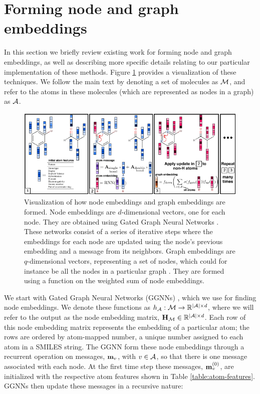 \section{Forming node and graph embeddings}

In this section we briefly review existing work for forming node and graph embeddings, as well as describing more specific details relating to our particular implementation of these methods. Figure \ref{fig:graph_nn} provides a visualization of these techniques. 
We follow the main text by denoting a set of molecules as ${\mathcal{M}}$, and refer to the atoms in these molecules (which are represented as nodes in a graph) as ${\mathcal{A}}$.


\begin{figure}
\centering
\includegraphics[width=\textwidth]{imgs/graph_nn}
\caption{
Visualization of how node embeddings and graph embeddings are formed. 
Node embeddings are $d$-dimensional vectors, one for each node. 
They are obtained using Gated Graph Neural Networks \citep{li2016gated}.
These networks consist of a series of iterative steps where the embeddings for each node are updated using the node's previous embedding and a message from its neighbors.
 Graph embeddings are $q$-dimensional vectors, representing a set of nodes, which could for instance be all the nodes in a particular graph \citep{li2018learning}.
  They are formed using a function on the weighted sum of node embeddings.
}
\label{fig:graph_nn}
\end{figure}


 We start with Gated Graph Neural Networks (GGNNs) \citep{li2016gated, gilmer2017neural}, which we use for finding node embeddings.
 We denote these functions as $h_{{\mathcal{A}}}: {\mathcal{M}} \to \mathbb{R}^{|{\mathcal{A}}|\times d}$, where we will refer to the output as the node embedding matrix, ${\mathbf{H}}_{{\mathcal{M}}} \in \mathbb{R}^{|{\mathcal{A}}|\times d}$. 
Each row of this node embedding matrix represents the embedding of a particular atom; the rows are ordered by atom-mapped number, a unique number assigned to each atom in a SMILES string.
The GGNN form these node embeddings through a recurrent operation on messages, ${\mathbf{m}}_v$, with $v \in {\mathcal{A}}$, so that there is one message associated with each node.
At the first time step these messages, ${\mathbf{m}}_v^{(0)}$, are initialized with the respective atom features shown in Table \ref{table:atom-features}. GGNNs then update these messages in a recursive nature:

